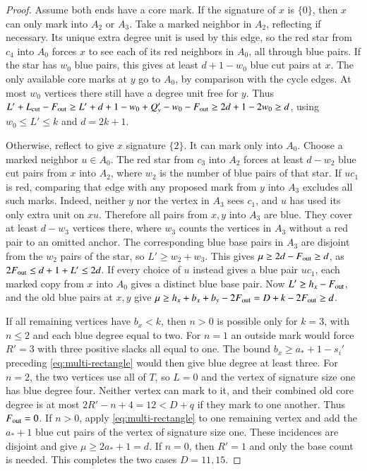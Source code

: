 \begin{proof}
Assume both ends have a core mark. If the signature of $x$
is $\{0\}$, then $x$ can only mark into $A_2$ or $A_3$.
Take a marked neighbor in $A_2$, reflecting if necessary.
Its unique extra degree unit is used by this edge, so the
red star from $c_4$ into $A_0$ forces $x$ to see each of its
red neighbors in $A_0$, all through blue pairs. If the star
has $w_0$ blue pairs, this gives at least $d+1-w_0$ blue cut
pairs at $x$. The only available core marks at $y$ go to
$A_0$, by comparison with the cycle edges. At most $w_0$
vertices there still have a degree unit free for $y$. Thus
$L'+L_{\rm cut}-F_{\rm out}\ge L'+d+1-w_0+Q_y'-w_0-F_{\rm out}\ge2d+1-2w_0\ge d$,
using $w_0\le L'\le k$ and $d=2k+1$.

Otherwise, reflect to give $x$ signature $\{2\}$. It can
mark only into $A_0$. Choose a marked neighbor $u\in A_0$.
The red star from $c_3$ into $A_2$ forces at least $d-w_2$
blue cut pairs from $x$ into $A_2$, where $w_2$ is the
number of blue pairs of that star. If $uc_1$ is red, comparing
that edge with any proposed mark from $y$ into $A_3$ excludes
all such marks. Indeed, neither $y$ nor the vertex in $A_3$
sees $c_1$, and $u$ has used its only extra unit on $xu$.
Therefore all pairs from $x,y$ into $A_3$ are blue. They
cover at least $d-w_3$ vertices there, where $w_3$ counts the
vertices in $A_3$ without a red pair to an omitted anchor.
The corresponding blue base pairs in $A_3$ are disjoint
from the $w_2$ pairs of the star, so $L'\ge w_2+w_3$.
This gives $\mu\ge 2d-F_{\rm out}\ge d$, as $2F_{\rm out}\le d+1+L'\le2d$.
If every choice of $u$ instead gives a blue pair $uc_1$,
each marked copy from $x$ into $A_0$ gives a distinct
blue base pair. Now $L'\ge h_x-F_{\rm out}$, and the old blue pairs
at $x,y$ give $\mu\ge h_x+b_x+b_y-2F_{\rm out}=D+k-2F_{\rm out}\ge d$.

If all remaining vertices have $b_x<k$, then $n>0$ is possible
only for $k=3$, with $n\le2$ and each blue degree equal to two.
For $n=1$ an outside mark would force $R'=3$ with three
positive slacks all equal to one. The bound
$b_x\ge a_*+1-s_i'$ preceding \eqref{eq:multi-rectangle}
would then give blue degree at least three. For $n=2$, the
two vertices use all of $T$, so $L=0$ and the vertex of
signature size one has blue degree four. Neither vertex can
mark to it, and their combined old core degree is at most
$2R'-n+4=12<D+q$ if they mark to one another. Thus $F_{\rm out}=0$.
If $n>0$, apply \eqref{eq:multi-rectangle} to one remaining
vertex and add the $a_*+1$ blue cut pairs of the vertex of
signature size one. These incidences are disjoint and give
$\mu\ge2a_*+1=d$. If $n=0$, then $R'=1$ and only the base
count is needed. This completes the two cases $D=11,15$.


\end{proof}
